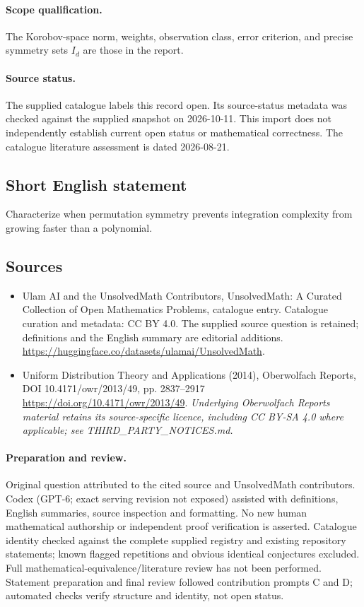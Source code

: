 \documentclass[11pt]{article}
\begin{document}
\paragraph{Scope qualification.}
The Korobov-space norm, weights, observation class, error criterion, and precise symmetry sets $I_d$ are those in the report.
\paragraph{Source status.}
The supplied catalogue labels this record open. Its source-status metadata was checked against the supplied snapshot on 2026-10-11. This import does not independently establish current open status or mathematical correctness. The catalogue literature assessment is dated 2026-08-21.
\subsection{Short English statement}
Characterize when permutation symmetry prevents integration complexity from growing faster than a polynomial.
\subsection{Sources}
\begin{itemize}
\item[S1] Ulam AI and the UnsolvedMath Contributors, UnsolvedMath: A Curated Collection of Open Mathematics Problems, catalogue entry. Catalogue curation and metadata: CC BY 4.0. The supplied source question is retained; definitions and the English summary are editorial additions.
\url{https://huggingface.co/datasets/ulamai/UnsolvedMath}.
\item[S2] Uniform Distribution Theory and Applications (2014), Oberwolfach Reports, DOI 10.4171/owr/2013/49, pp. 2837--2917
\url{https://doi.org/10.4171/owr/2013/49}.
\textit{Underlying Oberwolfach Reports material retains its source-specific licence, including CC BY-SA 4.0 where applicable; see THIRD\_PARTY\_NOTICES.md.}
\end{itemize}
\paragraph{Preparation and review.}
Original question attributed to the cited source and UnsolvedMath contributors. Codex (GPT-6; exact serving revision not exposed) assisted with definitions, English summaries, source inspection and formatting. No new human mathematical authorship or independent proof verification is asserted. Catalogue identity checked against the complete supplied registry and existing repository statements; known flagged repetitions and obvious identical conjectures excluded. Full mathematical-equivalence/literature review has not been performed. Statement preparation and final review followed contribution prompts C and D; automated checks verify structure and identity, not open status.
\label{end:statement}
\end{document}
